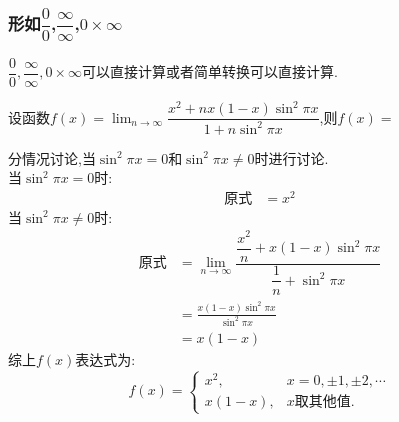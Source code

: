 \documentclass[8pt a4paper, oneside, UTF8]{ctexbook}
\begin{document}
\begin{sloppypar}
    \subsubsection{形如$\dfrac{0}{0}$,$\dfrac{\infty}{\infty}$,$0 \times \infty$}
         $\dfrac{0}{0},\dfrac{\infty}{\infty},0 \times \infty$可以直接计算或者简单转换可以直接计算.
    \begin{problem}
        设函数$f(x)=\operatorname*{lim}_{n\to\infty} \dfrac{x^2+nx(1-x)\sin^2\pi x}{1+n\sin^{2}\pi x}$,则$f(x)=$        
    \end{problem}
    \begin{solution}
        分情况讨论,当$\sin^2 \pi x=0$和$\sin^2 \pi x \neq 0$时进行讨论.\\
        当$\sin^2 \pi x=0$时:
        \begin{align*}
          \text{原式} & = x^2
        \end{align*}
        当$\sin^2 \pi x \neq 0$时:
        \begin{align*}
          \text{原式} & =\lim_{n\to\infty}\dfrac{\dfrac{x^{2}}{n}+x(1-x)\sin^{2}\pi x}{\dfrac{1}{n}+\sin^{2}\pi x}\\
          & =\frac{x(1-x)\sin^{2}\pi x}{\sin^{2}\pi x}\\
          & =x(1-x)    
        \end{align*}
        综上$f(x)$表达式为: $$f(x)=\begin{cases}x^2,&x=0, \pm1, \pm2, \cdots\\x(1-x),&x\text{取其他值}.\end{cases}$$
    \end{solution}

\end{sloppypar}
\end{document}
